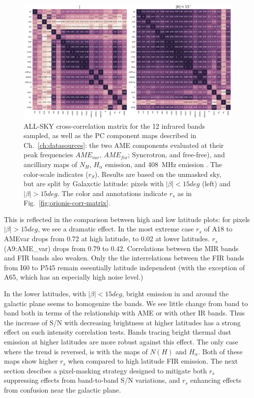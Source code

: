           \begin{figure}
            \includegraphics[width=\textwidth]{../Plots/ch_allsky/all_bands_corr_matrix_wAME_spearmanintensity_unmasked.pdf}
            \centering
            \caption{ALL-SKY cross-correlation matrix for the 12 infrared bands sampled, as well as the PC component maps described in Ch.~\ref{ch:datasources}: the two AME components evaluated at their peak frequencies $AME_{var}$, $AME_{fix}$; Syncrotron, and free-free), and ancilliary maps of $N_{H}$, $H_{\alpha}$ emission, and 408~MHz emission \cite{haslam82}. The color-scale indicates ($r_{S}$). Results are based on the unmasked sky, but are split by Galaxctic latitude: pixels with $|\beta| < 15deg$ (left) and $|\beta| > 15deg$. The color and annotations indicate $r_{s}$ as in Fig.~\ref{fig:orionis-corr-matrix}. }
            \label{fig:all_bands_corr_matrix_wAME_spearman}
          \end{figure}
        This is reflected in the comparison between high and low latitude plots: for pixels $|\beta| > 15deg$, we see a dramatic effect. In the most extreme case $r_{s}$ of A18 to AMEvar drops from 0.72 at high latitude, to 0.02 at lower latitudes. $r_{s}$(A9:AME_var) drops from 0.79 to 0.42. Correlations between the MIR bands and FIR bands also weaken. Only the the interrelations between the FIR bands from I60 to P545 remain eseentially latitude independent (with the exception of A65, which has an especially high noise level.)

        In the lower latitudes, with $|\beta| < 15deg$, bright emission in and around the galactic plane seems to homogenize the bands. We see little change from band to band both in terms of the relationship with AME or with other IR bands. Thus the increase of S/N with decreasing brightness at higher latitudes has a strong effect on such intensity correlation tests. Bands tracing bright thermal dust emission at higher latitudes are more robust against this effect. The only case where the trend is reversed, is with the maps of $N(H)$ and $H_{\alpha}$. Both of these maps show higher $r_{s}$ when compared to high latitude FIR emission. The next section descibes a pixel-masking strategy designed to mitigate both $r_{s}$ suppressing effects from band-to-band S/N variations, and $r_{s}$ enhancing effects from confusion near the galactic plane.


